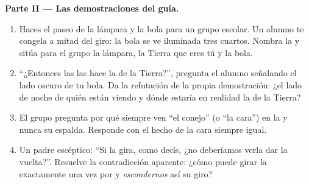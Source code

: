\begin{problem}
\medskip\noindent\textbf{Parte II --- Las demostraciones del guía.}
\begin{enumerate}[resume]
  \item Haces el paseo de la lámpara y la bola para un grupo escolar.
        Un alumno te congela a mitad del giro: la bola se ve
        iluminada tres cuartos. Nombra la  y sitúa para el grupo
        la lámpara, la Tierra que eres tú y la bola.
  \item ``¿Entonces las  las hace la  de la
        Tierra?'', pregunta el alumno señalando el lado oscuro de tu
        bola. Da la refutación de la propia demostración: ¿el lado de
        noche de quién están viendo y dónde estaría en realidad la
         de la Tierra?
  \item El grupo pregunta por qué siempre ven ``el conejo'' (o ``la
        cara'') en la  y nunca su espalda. Responde con el hecho
        de la cara siempre igual.
  \item Un padre escéptico: ``Si la  gira, como decís, ¿no
        deberíamos verla dar la vuelta?''. Resuelve la contradicción
        aparente: ¿cómo puede girar la  exactamente una vez por
         y \emph{escondernos} así su giro?
\end{enumerate}


\end{problem}
